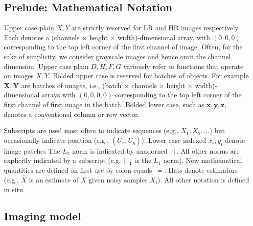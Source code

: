 \subsection{Prelude: Mathematical Notation}\label{subsec:notation}

Upper case plain \(X, Y\) are strictly reserved for LR and HR images respectively.
%
Each denotes a (channels\(\,\times\,\)height\(\,\times\,\)width)-dimensional array, with \((0, 0, 0)\) corresponding to the top left corner of the first channel of image.
%
Often, for the sake of simplicity, we consider grayscale images and hence omit the channel dimension.
%
Upper case plain \(D, H, F, G\) variously refer to functions that operate on images \(X,Y\).
%
Bolded upper case is reserved for batches of objects.
%
For example \(\bm{X}, \bm{Y}\) are batches of images, i.e., (batch\(\,\times\,\)channels\(\,\times\,\)height\(\,\times\,\)width)-dimensional arrays with \((0, 0, 0, 0)\) corresponding to the top left corner of the first channel of first image in the batch.
%
Bolded lower case, such as \(\bm{x}, \bm{y}, \bm{z}\), denotes a conventional column or row vector.

Subscripts are used most often to indicate sequences (e.g., \(X_1, X_2, \dots\)) but occasionally indicate position (e.g., \((U_x, U_y)\)).
%
Lower case indexed \(x_i, y_i\) denote image patches
%
The \(L_2\) norm is indicated by unadorned \(\abs{\cdot}\).
%
All other norms are explicitly indicated by a subscript (e.g. \(\abs{\cdot}_1\) is the \(L_1\) norm).
%
New mathematical quantities are defined on first use by colon-equals \(\coloneqq\).
%
Hats denote estimators (e.g., \(\hat{X}\) is an estimate of \(X\) given noisy samples \(X_i\)).
%
All other notation is defined in situ.

\subsection{Imaging model}\label{subsec:imaging-model}

